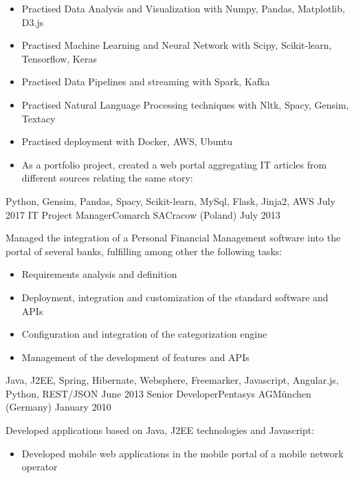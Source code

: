 \begin{experiences}
{                      \begin{itemize}
                      \item Practised Data Analysis and Visualization with Numpy, Pandas, Matplotlib, D3.js
                      \item Practised Machine Learning and Neural Network with Scipy, Scikit-learn, Tensorflow, Keras
					   \item Practised Data Pipelines and streaming with Spark, Kafka
					   \item Practised Natural Language Processing techniques with Nltk, Spacy, Gensim, Textacy
					   \item Practised deployment with Docker, AWS, Ubuntu
					   \item As a portfolio project, created a web portal aggregating IT articles from different sources relating the same story: 
                      \end{itemize}
                    }
                    {Python, Gensim, Pandas, Spacy, Scikit-learn, MySql, Flask, Jinja2, AWS}
  \emptySeparator
  \experience
    {July 2017} {IT Project Manager}{Comarch SA}{Cracow (Poland)}
    {July 2013} {Managed the integration of a Personal Financial Management software into the portal of several banks, fulfilling among other the following tasks:
       			 \begin{itemize}
                        \item Requirements analysis and definition                                                
                        \item Deployment, integration and customization of the standard software and APIs
                        \item Configuration and integration of the categorization engine                        
                        \item Management of the development of features and APIs                      
                      \end{itemize}
                    }
                    {Java, J2EE, Spring, Hibernate, Websphere, Freemarker, Javascript, Angular.js, Python, REST/JSON}
  \emptySeparator
  \experience
    {June 2013}    {Senior Developer}{Pentasys AG}{München (Germany)}
    {January 2010} {Developed applications based on Java, J2EE technologies and Javascript:   
                      \begin{itemize}
                        \item Developed mobile web applications in the mobile portal of a mobile network operator

\end{itemize}}
\end{experiences}
